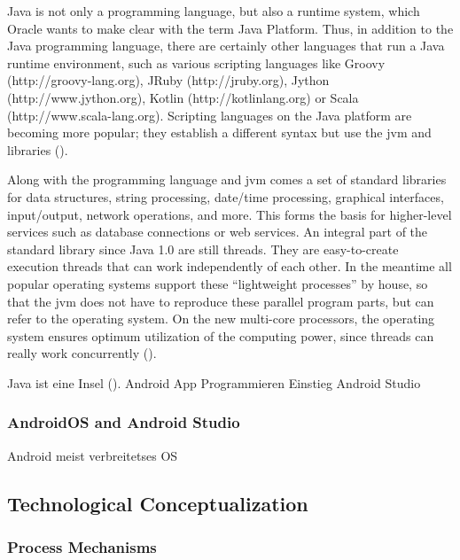 Java is not only a programming language, but also a runtime system, which Oracle wants to make clear with the term Java Platform. Thus, in addition to the Java programming language, there are certainly other languages that run a Java runtime environment, such as various scripting languages like Groovy (http://groovy-lang.org), JRuby (http://jruby.org), Jython (http://www.jython.org), Kotlin (http://kotlinlang.org) or Scala (http://www.scala-lang.org). Scripting languages on the Java platform are becoming more popular; they establish a different syntax but use the \ac{jvm} and libraries (\cite{Ullenboom.2017}).

Along with the programming language and \ac{jvm} comes a set of standard libraries for data structures, string processing, date/time processing, graphical interfaces, input/output, network operations, and more. This forms the basis for higher-level services such as database connections or web services. An integral part of the standard library since Java 1.0 are still threads. They are easy-to-create execution threads that can work independently of each other. In the meantime all popular operating systems support these \enquote{lightweight processes} by house, so that the \ac{jvm} does not have to reproduce these parallel program parts, but can refer to the operating system. On the new multi-core processors, the operating system ensures optimum utilization of the computing power, since threads can really work concurrently (\cite{Ullenboom.2017}).





Java ist eine Insel (\cite{Ullenboom.2017}).
Android App Programmieren Einstieg Android Studio \cite{Richter.2019}

\subsubsection{AndroidOS and Android Studio}

Android meist verbreitetses OS \cite{statcounter.2023}


\subsection{Technological Conceptualization}

\subsubsection{Process Mechanisms}

